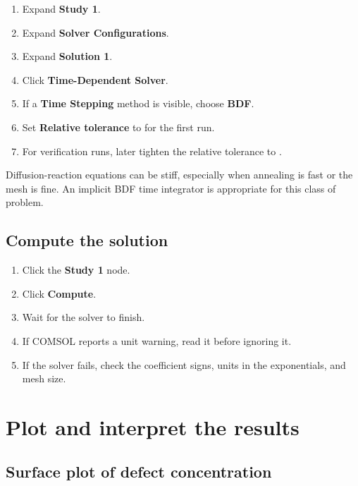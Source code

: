 \documentclass[11pt]{article}
\newcommand{\code}[1]{\texttt{\detokenize{#1}}}
\begin{document}
\begin{enumerate}[leftmargin=2em]
\item Expand \textbf{Study 1}.
\item Expand \textbf{Solver Configurations}.
\item Expand \textbf{Solution 1}.
\item Click \textbf{Time-Dependent Solver}.
\item If a \textbf{Time Stepping} method is visible, choose \textbf{BDF}.
\item Set \textbf{Relative tolerance} to \code{1e-3} for the first run.
\item For verification runs, later tighten the relative tolerance to \code{1e-5}.
\end{enumerate}

Diffusion-reaction equations can be stiff, especially when annealing is fast or the mesh is fine. An implicit BDF time integrator is appropriate for this class of problem.

\subsection{Compute the solution}

\begin{enumerate}[leftmargin=2em]
\item Click the \textbf{Study 1} node.
\item Click \textbf{Compute}.
\item Wait for the solver to finish.
\item If COMSOL reports a unit warning, read it before ignoring it.
\item If the solver fails, check the coefficient signs, units in the exponentials, and mesh size.
\end{enumerate}

\section{Plot and interpret the results}

\subsection{Surface plot of defect concentration}
\end{document}
